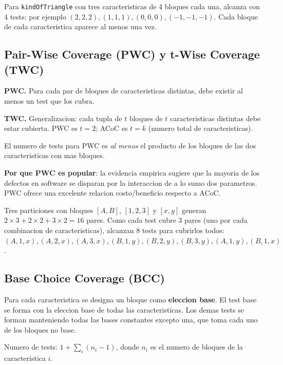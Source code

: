 \documentclass[12pt,a4paper]{article}
\begin{document}
\begin{ejemplobox}
Para \texttt{kindOfTriangle} con tres caracteristicas de 4 bloques cada una, alcanza con 4 tests:
por ejemplo \((2,2,2),(1,1,1),(0,0,0),(-1,-1,-1)\). Cada bloque de cada caracteristica aparece al
menos una vez.
\end{ejemplobox}

\subsection{Pair-Wise Coverage (PWC) y t-Wise Coverage (TWC)}

\begin{definicionbox}
\textbf{PWC.} Para cada par de bloques de caracteristicas distintas, debe existir al menos un
test que los cubra.

\textbf{TWC.} Generalizacion: cada tupla de \(t\) bloques de \(t\) caracteristicas distintas debe
estar cubierta. PWC es \(t = 2\); ACoC es \(t = k\) (numero total de caracteristicas).
\end{definicionbox}

El numero de tests para PWC es \emph{al menos} el producto de los bloques de las dos
caracteristicas con mas bloques.

\textbf{Por que PWC es popular}: la evidencia empirica sugiere que la mayoria de los defectos en
software se disparan por la interaccion de a lo sumo dos parametros. PWC ofrece una excelente
relacion costo/beneficio respecto a ACoC.

\begin{ejemplobox}
Tres particiones con bloques \([A,B]\), \([1,2,3]\) y \([x,y]\) generan
\(2 \times 3 + 2 \times 2 + 3 \times 2 = 16\) pares. Como cada test cubre 3 pares (uno por cada
combinacion de caracteristicas), alcanzan 8 tests para cubrirlos todos:
\((A,1,x),(A,2,x),(A,3,x),(B,1,y),(B,2,y),(B,3,y),(A,1,y),(B,1,x)\).
\end{ejemplobox}

\subsection{Base Choice Coverage (BCC)}

\begin{definicionbox}
Para cada caracteristica se designa un bloque como \textbf{eleccion base}. El test base se forma
con la eleccion base de todas las caracteristicas. Los demas tests se forman manteniendo todas las
bases constantes excepto una, que toma cada uno de los bloques no base.

Numero de tests: \(1 + \sum_i (n_i - 1)\), donde \(n_i\) es el numero de bloques de la
caracteristica \(i\).
\end{definicionbox}
\end{document}
